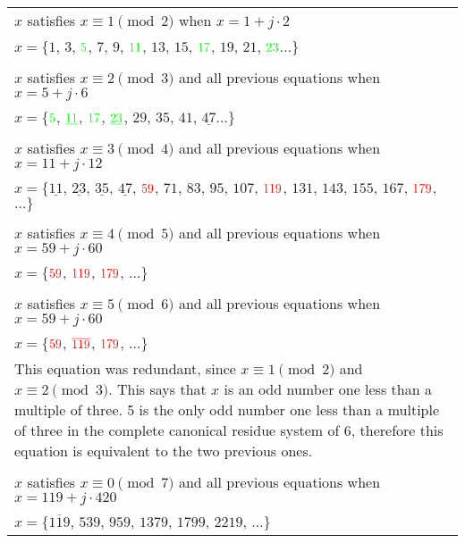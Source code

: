 \begin{longtable}[t]{p{7in}}
\\ \(x\) satisfies \(x \equiv 1 \pmod {2}\)
when \(x = 1 + j \cdot 2\) \\
\(x = \{\)\(1\), \(3\), \(\color{green}5\), \(7\), \(9\), \(\color{green}11\), \(13\), \(15\), \(\color{green}17\), \(19\), \(21\), \(\color{green}23\)\(\dots\}\) \\
\\ \(x\) satisfies \(x \equiv 2 \pmod {3}\) and all previous equations
when \(x = 5 + j \cdot 6\) \\
\(x = \{\)\(\color{green}5\), \(\underline{\color{green}11}\), \(\color{green}17\), \(\underline{\color{green}23}\), \(29\), \(35\), \(41\), \(\underline{47}\)\(\dots\}\) \\
\\ \(x\) satisfies \(x \equiv 3 \pmod {4}\) and all previous equations
when \(x = 11 + j \cdot 12\) \\
\(x = \{\)\(\underline{11}\), \(\underline{23}\), \(\underline{35}\), \(\underline{47}\), \(\color{red}59\), \(71\), \(83\), \(95\), \(107\), \(\color{red}119\), \(131\), \(143\), \(155\), \(167\), \(\color{red}179\), \(\dots\}\) \\
\\ \(x\) satisfies \(x \equiv 4 \pmod {5}\) and all previous equations
when \(x = 59 + j \cdot 60\) \\
\(x = \{\)\(\color{red}59\), \(\color{red}119\), \(\color{red}179\), \(\dots\}\) \\
\\ \(x\) satisfies \(x \equiv 5 \pmod {6}\) and all previous equations
when \(x = 59 + j \cdot 60\) \\
\(x = \{\)\(\color{red}59\), \(\color{red}\overline{119}\), \(\color{red}179\), \(\dots\}\) \\
This equation was redundant, since \(x \equiv 1 \pmod 2\) and \(x \equiv 2 \pmod 3\). This says that \(x\) is an odd number one less than a multiple of three. 5 is the only odd number one less than a multiple of three in the complete canonical residue system of 6, therefore this equation is equivalent to the two previous ones. \\
\\ \(x\) satisfies \(x \equiv 0 \pmod {7}\) and all previous equations
when \(x = 119 + j \cdot 420\) \\
\(x = \{\)\(\overline{119}\), \(539\), \(959\), \(1379\), \(1799\), \(2219\), \(\dots\}\) \\
\end{longtable}

